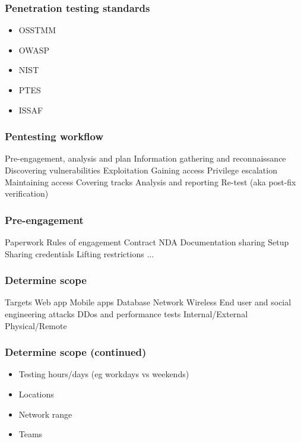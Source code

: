 \begin{frame}
    \frametitle{Penetration testing standards}

    \note[item]{
    }
    
	\begin{itemize}
		\item OSSTMM
		\item OWASP
		\item NIST
		\item PTES
		\item ISSAF		
	\end{itemize}	    
\end{frame}

\begin{frame}
    \frametitle{Pentesting workflow}

    \note[item]{
        }
        
	\begin{outline}
		\1 Pre-engagement, analysis and plan
		\1 Information gathering and reconnaissance
		\1 Discovering vulnerabilities
		\1 Exploitation
			\2 Gaining access
			\2 Privilege escalation
			\2 Maintaining access
			\2 Covering tracks
		\1 Analysis and reporting
		\1 Re-test (aka post-fix verification)
	\end{outline}
\end{frame}

\begin{frame}
    \frametitle{Pre-engagement}

    \note[item]{
    }
    
	\begin{outline}
		\1 Paperwork
			\2 Rules of engagement
			\2 Contract
			\2 NDA
		\1 Documentation sharing
		\1 Setup	
			\2 Sharing credentials
			\2 Lifting restrictions
			\2 ...
	\end{outline}	    
\end{frame}

\begin{frame}
    \frametitle{Determine scope}

    \note[item]{
    }
    
	\begin{outline}
		\1 Targets
			\2 Web app
			\2 Mobile apps
			\2 Database
			\2 Network
			\2 Wireless
		\1 End user and social engineering attacks
		\1 DDos and performance tests
		\1 Internal/External
		\1 Physical/Remote
	\end{outline}	    
\end{frame}

\begin{frame}
    \frametitle{Determine scope (continued)}

    \note[item]{
    }
    
	\begin{itemize}
		\item Testing hours/days (eg workdays vs weekends)
		\item Locations
		\item Network range
		\item Teams
	\end{itemize}	    
\end{frame}


